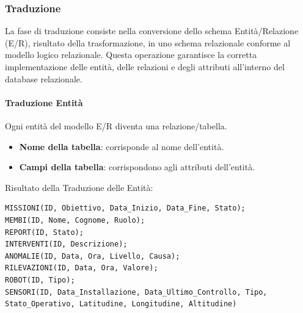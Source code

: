 \subsubsection{Traduzione}

La fase di traduzione consiste nella conversione dello schema Entità/Relazione (E/R), risultato della trasformazione, in uno schema relazionale conforme al modello logico relazionale. Questa operazione garantisce la corretta implementazione delle entità, delle relazioni e degli attributi all'interno del database relazionale.

\paragraph{Traduzione Entità}

Ogni entità del modello E/R diventa una relazione/tabella.
\begin{itemize}
    \item \textbf{Nome della tabella}: corrisponde al nome dell’entità.
    \item \textbf{Campi della tabella}: corrispondono agli attributi dell’entità.
\end{itemize}

Risultato della Traduzione delle Entità:
\begin{lstlisting}
MISSIONI(ID, Obiettivo, Data_Inizio, Data_Fine, Stato);
MEMBI(ID, Nome, Cognome, Ruolo);
REPORT(ID, Stato);
INTERVENTI(ID, Descrizione);
ANOMALIE(ID, Data, Ora, Livello, Causa);
RILEVAZIONI(ID, Data, Ora, Valore);
ROBOT(ID, Tipo);
SENSORI(ID, Data_Installazione, Data_Ultimo_Controllo, Tipo, Stato_Operativo, Latitudine, Longitudine, Altitudine)
\end{lstlisting}


